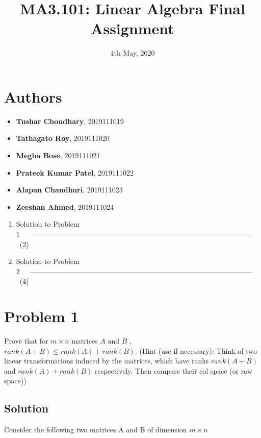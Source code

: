 \documentclass{article}
\title{MA3.101: Linear Algebra Final Assignment}
\date{4th May, 2020}
\begin{document}

\section*{Authors}

\begin{itemize}
    \item \textbf{Tushar Choudhary}, 2019111019\\
    \item \textbf{Tathagato Roy}, 2019111020\\
    \item \textbf{Megha Bose}, 2019111021\\
    \item \textbf{Prateek Kumar Patel}, 2019111022\\
    \item \textbf{Alapan Chaudhuri}, 2019111023\\
    \item \textbf{Zeeshan Ahmed}, 2019111024\\
\end{itemize}

\tableofcontents
\begin{enumerate}
    \item Solution to Problem 1\ \ \        ---------------------------------------------------------------------------------------------\ \ \ (2)
    \item Solution to Problem 2\ \ \        ---------------------------------------------------------------------------------------------\ \ \ (4)
\end{enumerate}

\newpage
\section*{Problem 1}
Prove that for $m \times n$ matrices $A$ and $B$ , $rank(A+B) \leq rank(A) +rank(B)$. (Hint (use if necessary): Think of two linear transformations induced by the matrices, which have ranks $rank(A+B)$ and $rank(A)+rank(B)$ respectively. Then compare their col space (or row space))
\subsection*{Solution}
Consider the following two matrices A and B of dimension $m \times n$
\end{document}
